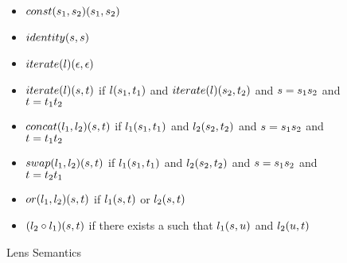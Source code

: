 \begin{figure}[b]
\centering
\begin{itemize}
\item $const(s_1,s_2)(s_1,s_2)$

\item $identity(s,s)$

\item $iterate(l)(\epsilon,\epsilon)$

\item $iterate(l)(s,t)$
if $l(s_1,t_1)$
and $iterate(l)(s_2,t_2)$
and $s=s_1s_2$
and $t=t_1t_2$

\item $concat(l_1,l_2)(s,t)$
if $l_1(s_1,t_1)$
and $l_2(s_2,t_2)$
and $s=s_1s_2$
and $t=t_1t_2$

\item $swap(l_1,l_2)(s,t)$
if $l_1(s_1,t_1)$
and $l_2(s_2,t_2)$
and $s=s_1s_2$
and $t=t_2t_1$

\item $or(l_1,l_2)(s,t)$
if $l_1(s,t)$
or $l_2(s,t)$

\item $(l_2 \circ l_1)(s,t)$
if there exists a \StringAltAlt{} such that
$l_1(s,u)$
and $l_2(u,t)$
\end{itemize}
\caption{Lens Semantics}
\label{fig:lens-semantics}
\end{figure}
